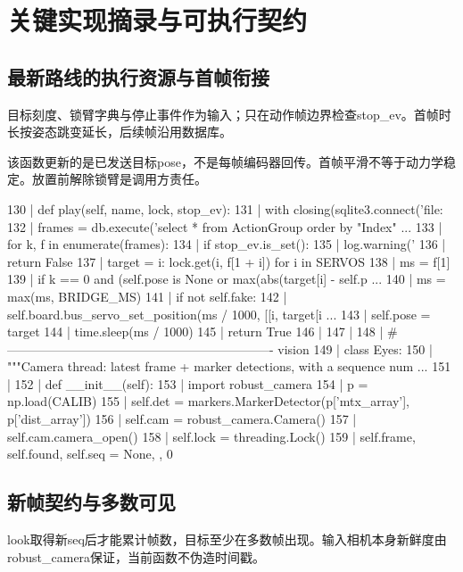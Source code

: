 \section{关键实现摘录与可执行契约}
\subsection{最新路线的执行资源与首帧衔接}
目标刻度、锁臂字典与停止事件作为输入；只在动作帧边界检查stop\_ev。首帧时长按姿态跳变延长，后续帧沿用数据库。

该函数更新的是已发送目标pose，不是每帧编码器回传。首帧平滑不等于动力学稳定。放置前解除锁臂是调用方责任。
\begin{CodeBlock}
 130 |     def play(self, name, lock, stop_ev):
 131 |         with closing(sqlite3.connect('file:%
 132 |             frames = db.execute('select * from ActionGroup order by "Index" ...
 133 |         for k, f in enumerate(frames):
 134 |             if stop_ev.is_set():
 135 |                 log.warning('%
 136 |                 return False
 137 |             target = {i: lock.get(i, f[1 + i]) for i in SERVOS}
 138 |             ms = f[1]
 139 |             if k == 0 and (self.pose is None or max(abs(target[i] - self.p  ...
 140 |                 ms = max(ms, BRIDGE_MS)
 141 |             if not self.fake:
 142 |                 self.board.bus_servo_set_position(ms / 1000, [[i, target[i  ...
 143 |             self.pose = target
 144 |             time.sleep(ms / 1000)
 145 |         return True
 146 | 
 147 | 
 148 | # ---------------------------------------------------------------- vision
 149 | class Eyes:
 150 |     """Camera thread: latest frame + marker detections, with a sequence num ...
 151 | 
 152 |     def __init__(self):
 153 |         import robust_camera
 154 |         p = np.load(CALIB)
 155 |         self.det = markers.MarkerDetector(p['mtx_array'], p['dist_array'])
 156 |         self.cam = robust_camera.Camera()
 157 |         self.cam.camera_open()
 158 |         self.lock = threading.Lock()
 159 |         self.frame, self.found, self.seq = None, {}, 0
\end{CodeBlock}
\subsection{新帧契约与多数可见}
look取得新seq后才能累计帧数，目标至少在多数帧出现。输入相机本身新鲜度由robust\_camera保证，当前函数不伪造时间戳。


